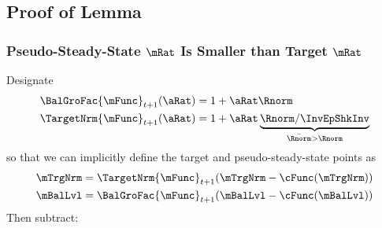 \documentclass[\econtexRoot/BufferStockTheory]{subfiles}
\begin{document}

\subsection{Proof of Lemma}%

\subsubsection{Pseudo-Steady-State \texorpdfstring{$\mRat$}{m} Is Smaller than Target \texorpdfstring{$\mRat$}{m}}
Designate
\begin{equation}\begin{split}
  \BalGroFac{\mFunc}_{t+1}(\aRat) %
   & = 1+\aRat\Rnorm
\\  \TargetNrm{\mFunc}_{t+1}(\aRat)%
 & = 1+\aRat\underbrace{\Rnorm/\InvEpShkInv}_{\bar{\Rnorm} > \Rnorm}
\end{split}\end{equation}
so that we can implicitly define the target and pseudo-steady-state points as
\begin{equation}\begin{split}
  \mTrgNrm & =\TargetNrm{\mFunc}_{t+1}(\mTrgNrm-\cFunc(\mTrgNrm))
  \\ \mBalLvl & = \BalGroFac{\mFunc}_{t+1}(\mBalLvl-\cFunc(\mBalLvl))
\end{split}\end{equation}
Then subtract:
\end{document}
